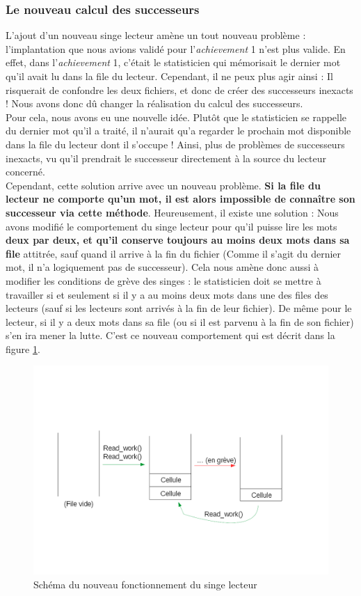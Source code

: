 \documentclass{article}
\begin{document}
\subsubsection{Le nouveau calcul des successeurs}
L'ajout d'un nouveau singe lecteur amène un tout nouveau problème : l'implantation que nous avions validé pour l'\emph{achievement} 1 n'est plus valide. En effet, dans l'\emph{achievement} 1, c'était le statisticien qui mémorisait le dernier mot qu'il avait lu dans la file du lecteur. Cependant, il ne peux plus agir ainsi : Il risquerait de confondre les deux fichiers, et donc de créer des successeurs inexacts !
Nous avons donc dû changer la réalisation du calcul des successeurs.\\
Pour cela, nous avons eu une nouvelle idée. Plutôt que le statisticien se rappelle du dernier mot qu'il a traité, il n'aurait qu'a regarder le prochain mot disponible dans la file du lecteur dont il s'occupe ! Ainsi, plus de problèmes de successeurs inexacts, vu qu'il prendrait le successeur directement à la source du lecteur concerné. \\ 
Cependant, cette solution arrive avec un nouveau problème. \textbf{Si la file du lecteur ne comporte qu'un mot, il est alors impossible de connaître son successeur via cette méthode}. Heureusement, il existe une solution : Nous avons modifié le comportement du singe lecteur pour qu'il puisse lire les mots \textbf{deux par deux, et qu'il conserve toujours au moins deux mots dans sa file} attitrée, sauf quand il arrive à la fin du fichier (Comme il s'agit du dernier mot, il n'a logiquement pas de successeur).
Cela nous amène donc aussi à modifier les conditions de grève des singes : le statisticien doit se mettre à travailler si et seulement si il y a au moins deux mots dans une des files des lecteurs (sauf si les lecteurs sont arrivés à la fin de leur fichier). De même pour le lecteur, si il y a deux mots dans sa file (ou si il est parvenu à la fin de son fichier) s'en ira mener la lutte. C'est ce nouveau comportement qui est décrit dans la figure \ref{fig:schema_reader_new_attitude}.

\begin{figure}[H]
    \centering
    \includegraphics[width=\linewidth]{rapport_schema_1.png}
    \caption{Schéma du nouveau fonctionnement du singe lecteur}
    \label{fig:schema_reader_new_attitude}
\end{figure}
\end{document}
